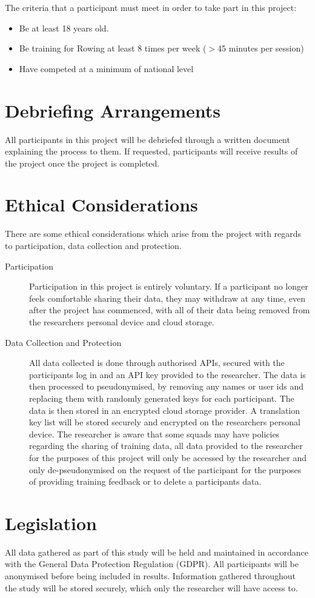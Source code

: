 The criteria that a participant must meet in order to take part in this project:
\begin{itemize}
    \item Be at least 18 years old.
    \item Be training for Rowing at least 8 times per week ($>$45 minutes per session)
    \item Have competed at a minimum of national level
\end{itemize}
\section*{Debriefing Arrangements}
All participants in this project will be debriefed through a written document explaining the process to them. If requested, participants will receive results of the project once the project is completed.
\section*{Ethical Considerations}
There are some ethical considerations which arise from the project with regards to participation, data collection and protection.
\begin{description}
    \item [Participation] Participation in this project is entirely voluntary. If a participant no longer feels comfortable sharing their data, they may withdraw at any time, even after the project has commenced, with all of their data being removed from the researchers personal device and cloud storage.
    \item [Data Collection and Protection] All data collected is done through authorised APIs, secured with the participants log in and an API key provided to the researcher. The data is then processed to pseudonymised, by removing any names or user ids and replacing them with randomly generated keys for each participant. The data is then stored in an encrypted cloud storage provider. A translation key list will be stored securely and encrypted on the researchers personal device. The researcher is aware that some squads may have policies regarding the sharing of training data, all data provided to the researcher for the purposes of this project will only be accessed by the researcher and only de-pseudonymised on the request of the participant for the purposes of providing training feedback or to delete a participants data.
\end{description}
\section*{Legislation}
All data gathered as part of this study will be held and maintained in accordance with the General Data Protection Regulation (GDPR). All participants will be anonymised before being included in results. Information gathered throughout the study will be stored securely, which only the researcher will have access to.
